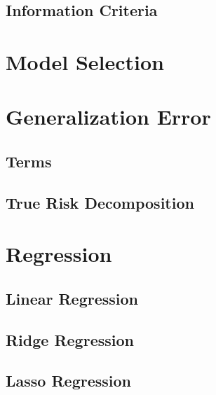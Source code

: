 \documentclass[18pt,a3paper,landscape, ncols=2]{cheatsheet}
\begin{document}
	\subsection{Information Criteria}
		\begin{mdframed}
		\end{mdframed}

\section{Model Selection} \seperator
	\begin{mdframed}
	\end{mdframed}

\section{Generalization Error} \seperator
	\subsection{Terms}
		\begin{mdframed}
		\end{mdframed}
	\subsection{True Risk Decomposition}
		\begin{mdframed}
		\end{mdframed}

\vfill\null %
\columnbreak %

\section{Regression} \seperator
	\subsection{Linear Regression}
		\begin{mdframed}
		\end{mdframed}
	\subsection{Ridge Regression}
		\begin{mdframed}
		\end{mdframed}
	\subsection{Lasso Regression}
		\begin{mdframed}
		\end{mdframed}
\end{document}
